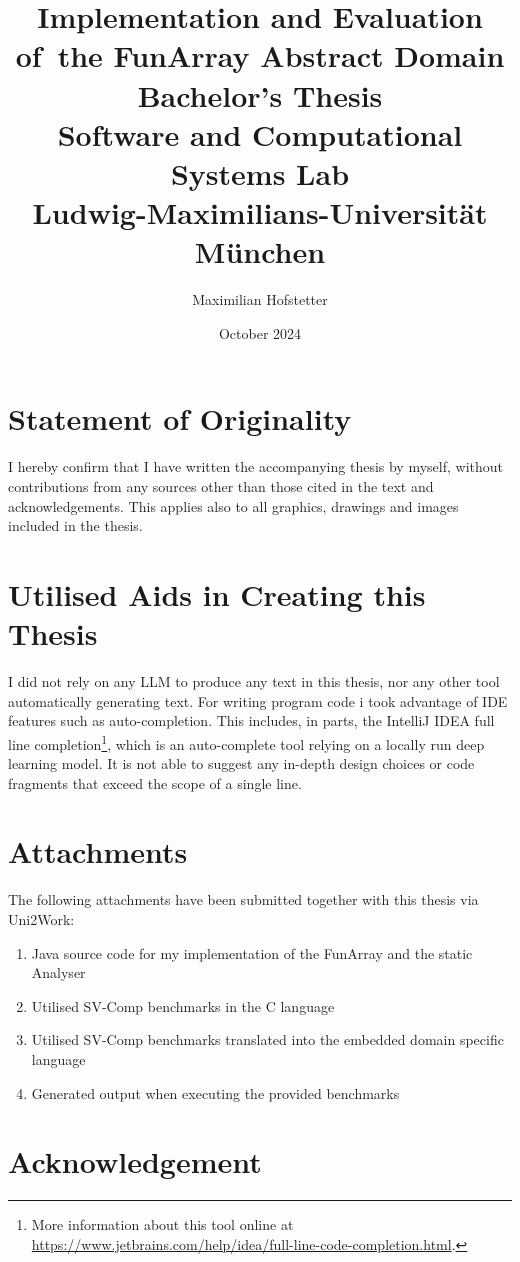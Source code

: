 \documentclass{report}
\title{\Huge{}Implementation and Evaluation of~the FunArray Abstract Domain\\[1em]\large{}Bachelor's Thesis\\[1em]Software and Computational Systems Lab\\Ludwig-Maximilians-Universit\"at M\"unchen}
\date{October 2024}
\author{Maximilian Hofstetter}
\begin{document}
\maketitle

\section*{Statement of Originality}
\thispagestyle{empty}
I hereby confirm that I have written the accompanying thesis by myself, without contributions from any sources other than those cited in the text and acknowledgements. This applies also to all graphics, drawings and images included in the thesis.

\section*{Utilised Aids in Creating this Thesis}

I did not rely on any LLM to produce any text in this thesis, nor any other tool automatically generating text. For writing program code i took advantage of IDE features such as auto-completion. This includes, in parts, the IntelliJ IDEA full line completion\footnote{More information about this tool online at \url{https://www.jetbrains.com/help/idea/full-line-code-completion.html}.}, which is an auto-complete tool relying on a locally run deep learning model. It is not able to suggest any in-depth design choices or code fragments that exceed the scope of a single line.

\section*{Attachments}

The following attachments have been submitted together with this thesis via Uni2Work:

\begin{enumerate}
	\item Java source code for my implementation of the FunArray and the static Analyser
	\item Utilised SV-Comp benchmarks in the C language
	\item Utilised SV-Comp benchmarks translated into the embedded domain specific language
	\item Generated output when executing the provided benchmarks
\end{enumerate}

\section*{Acknowledgement}
\end{document}
